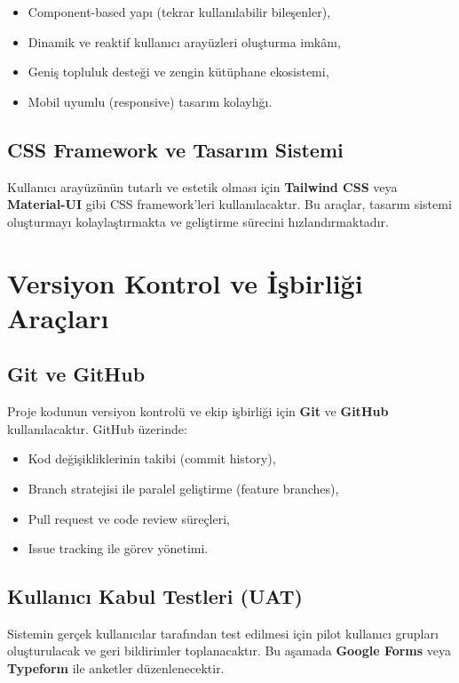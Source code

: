 \documentclass[a4paper,12pt]{report}
\begin{document}
\begin{itemize}
    \item Component-based yapı (tekrar kullanılabilir bileşenler),
    \item Dinamik ve reaktif kullanıcı arayüzleri oluşturma imkânı,
    \item Geniş topluluk desteği ve zengin kütüphane ekosistemi,
    \item Mobil uyumlu (responsive) tasarım kolaylığı.
\end{itemize}

\subsection{CSS Framework ve Tasarım Sistemi}

Kullanıcı arayüzünün tutarlı ve estetik olması için \textbf{Tailwind CSS} veya \textbf{Material-UI} gibi CSS framework'leri kullanılacaktır. Bu araçlar, tasarım sistemi oluşturmayı kolaylaştırmakta ve geliştirme sürecini hızlandırmaktadır.

\section{Versiyon Kontrol ve İşbirliği Araçları}

\subsection{Git ve GitHub}

Proje kodunun versiyon kontrolü ve ekip işbirliği için \textbf{Git} ve \textbf{GitHub} kullanılacaktır. GitHub üzerinde:

\begin{itemize}
    \item Kod değişikliklerinin takibi (commit history),
    \item Branch stratejisi ile paralel geliştirme (feature branches),
    \item Pull request ve code review süreçleri,
    \item Issue tracking ile görev yönetimi.
\end{itemize}

\subsection{Kullanıcı Kabul Testleri (UAT)}

Sistemin gerçek kullanıcılar tarafından test edilmesi için pilot kullanıcı grupları oluşturulacak ve geri bildirimler toplanacaktır. Bu aşamada \textbf{Google Forms} veya \textbf{Typeform} ile anketler düzenlenecektir.
\end{document}
